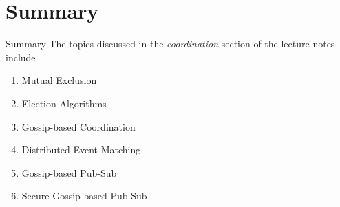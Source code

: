 \section{Summary}
\begin{frame}{Summary}
  The topics discussed in the \emph{coordination} section
  of the lecture notes include
  \begin{enumerate}
    \item Mutual Exclusion
    \item Election Algorithms
    \item Gossip-based Coordination
    \item Distributed Event Matching
    \item Gossip-based Pub-Sub
    \item Secure Gossip-based Pub-Sub
  \end{enumerate}
\end{frame}
